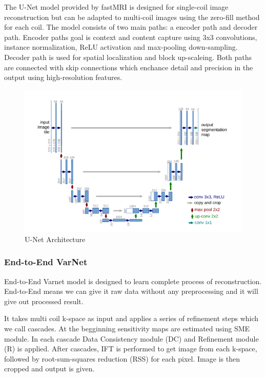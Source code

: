 \documentclass[10pt,a4paper]{article}
\begin{document}
The U-Net model provided by fastMRI is designed for single-coil image reconstruction but can be adapted to multi-coil images using the zero-fill method for each coil. The model consists of two main paths: a encoder path and decoder path. Encoder paths goal is context and content capture using 3x3 convolutions, instance normalization, ReLU activation and max-pooling down-sampling. Decoder path is used for spatial localization and block up-scaleing. Both paths are connected with skip connections which enchance detail and precision in the output using high-resolution features. \cite{ronneberger2015unet} \cite{zbontar2019fastmri}

\begin{figure}[H]
\centering
\includegraphics[scale=0.5]{images/unet-architecture.png}
\caption{U-Net Architecture \cite{ronneberger2015unet}}
\end{figure}

\subsubsection{End-to-End VarNet}

End-to-End Varnet model is designed to learn complete process of reconstruction. End-to-End means we can give it raw data without any preprocessing and it will give out processed result. \cite{sriram2020endtoend}

It takes multi coil k-space as input and applies a series of refinement steps which we call cascades. At the begginning sensitivity maps are estimated using SME module. In each cascade Data Consistency module (DC) and Refinement module (R) is applied. After cascades, IFT is performed to get image from each k-space, followed by root-sum-squares reduction (RSS) for each pixel. Image is then cropped and output is given. \cite{sriram2020endtoend}
\end{document}
